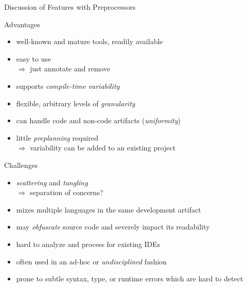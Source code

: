\newcommand{\MajorChallengesOfPreprocessors}{
	\item \emph{scattering} and \emph{tangling}\\
	$\Rightarrow$ separation of concerns?
	\item mixes multiple languages in the same development artifact
	\item may \emph{obfuscate} source code and severely impact its readability
	\item hard to analyze and process for existing IDEs
	\item often used in an ad-hoc or \emph{undisciplined} fashion
	\item prone to subtle syntax, type, or runtime errors which are hard to detect \mysource{\lectureinteractions--\lecturetesting}
}
\begin{frame}{Discussion of Features with Preprocessors}
	\begin{mycolumns}[animation=none]
		\begin{note}{Advantages}
			\begin{itemize}
				\item well-known and mature tools, readily available
				\item easy to use\\
				$\Rightarrow$ just annotate and remove
				\item supports \emph{compile-time variability}
				\item flexible, arbitrary levels of \emph{granularity}
				\item can handle code and non-code artifacts (\emph{uniformity})
				\item little \emph{preplanning} required\\
				$\Rightarrow$ variability can be added to an existing project
			\end{itemize}
		\end{note}
	\mynextcolumn
		\pause
		\begin{note}{Challenges}
			\begin{itemize}
				\MajorChallengesOfPreprocessors
			\end{itemize}
		\end{note}
	\end{mycolumns}
\end{frame}

